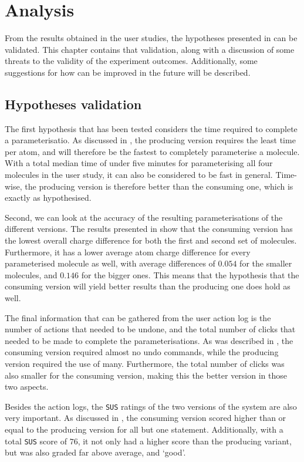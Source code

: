 \chapter{Analysis}

From the results obtained in the user studies, the hypotheses presented in  can be validated. This chapter contains that validation, along with a discussion of some threats to the validity of the experiment outcomes. Additionally, some suggestions for how \oframp{} can be improved in the future will be described.



\section{Hypotheses validation}
The first hypothesis that has been tested considers the time required to complete a parameterisatio. As discussed in , the producing version requires the least time per atom, and will therefore be the fastest to completely parameterise a molecule. With a total median time of under five minutes for parameterising all four molecules in the user study, it can also be considered to be fast in general. Time-wise, the producing version is therefore better than the consuming one, which is exactly as hypothesised.

Second, we can look at the accuracy of the resulting parameterisations of the different versions. The results presented in  show that the consuming version has the lowest overall charge difference for both the first and second set of molecules. Furthermore, it has a lower average atom charge difference for every parameterised molecule as well, with average differences of $0.054$ for the smaller molecules, and $0.146$ for the bigger ones. This means that the hypothesis that the consuming version will yield better results than the producing one does hold as well.

The final information that can be gathered from the user action log is the number of actions that needed to be undone, and the total number of clicks that needed to be made to complete the parameterisations. As was described in , the consuming version required almost no undo commands, while the producing version required the use of many. Furthermore, the total number of clicks was also smaller for the consuming version, making this the better version in those two aspects.

Besides the action logs, the \verb|SUS| ratings of the two versions of the system are also very important. As discussed in , the consuming version scored higher than or equal to the producing version for all but one statement. Additionally, with a total \verb|SUS| score of $76$, it not only had a higher score than the producing variant, but was also graded far above average, and `good'.

